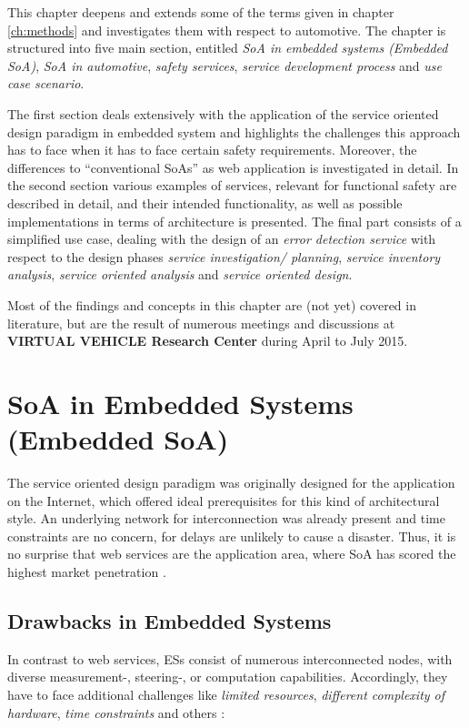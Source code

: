 \label{ch:results}
This chapter deepens and extends some of the terms given in chapter \ref{ch:methods} and investigates them with respect to automotive. The chapter is structured into five main section, entitled \emph{SoA in embedded systems (Embedded SoA)}, \emph{SoA in automotive}, \emph{safety services}, \emph{service development process} and \emph{use case scenario}. 

The first section deals extensively with the application of the service oriented design paradigm in embedded system and highlights the challenges this approach has to face when it has to face certain safety requirements. Moreover, the differences to ``conventional SoAs'' as web application is investigated in detail. In the second section various examples of services, relevant for functional safety are described in detail, and their intended functionality, as well as possible implementations in terms of architecture is presented. The final part consists of a simplified use case, dealing with the design of an \emph{error detection service} with respect to the design phases \emph{service investigation/ planning}, \emph{service inventory analysis}, \emph{service oriented analysis} and \emph{service oriented design}.

Most of the findings and concepts in this chapter are (not yet) covered in literature, but are the result of numerous meetings and discussions at \textbf{VIRTUAL VEHICLE Research Center} during April to July 2015.







\section{SoA in Embedded Systems (Embedded SoA)}
\label{sec:soa-in-embedded-systems}

The service oriented design paradigm was originally designed for the application on the Internet, which offered ideal prerequisites for this kind of architectural style. An underlying network for interconnection was already present and time constraints are no concern, for delays are unlikely to cause a disaster. Thus, it is no surprise that web services are the application area, where SoA has scored the highest market penetration \cite{rodrigues2011} \cite{buckl}.


\subsection{Drawbacks in Embedded Systems}
In contrast to web services, ESs consist of numerous interconnected nodes, with diverse measurement-, steering-, or computation capabilities. Accordingly, they have to face additional challenges like \emph{limited resources}, \emph{different complexity of hardware}, \emph{time constraints} and others \cite{scholz} \cite{sommer}: 

